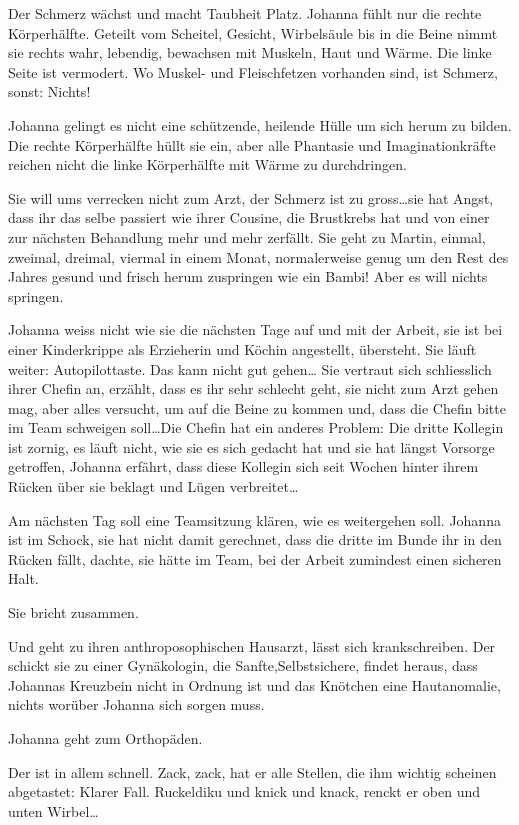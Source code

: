 \documentclass[10pt,titlepage,a5paper]{book}
\begin{document}
Der Schmerz wächst  und macht Taubheit Platz. Johanna fühlt nur die rechte Körperhälfte. Geteilt vom Scheitel, Gesicht, Wirbelsäule bis in die Beine nimmt sie rechts wahr, lebendig, bewachsen mit Muskeln, Haut und Wärme. Die linke Seite ist vermodert. Wo Muskel- und Fleischfetzen vorhanden sind, ist Schmerz, sonst: Nichts! 

Johanna gelingt es nicht eine schützende, heilende Hülle um sich herum zu bilden. Die rechte Körperhälfte hüllt sie ein, aber alle Phantasie und Imaginationkräfte reichen nicht die linke Körperhälfte mit Wärme zu durchdringen.

Sie will ums verrecken nicht zum Arzt, der Schmerz ist zu gross\dots sie hat Angst, dass ihr das selbe passiert wie ihrer Cousine, die Brustkrebs hat und von einer zur nächsten Behandlung mehr und mehr zerfällt.
Sie geht zu Martin, einmal, zweimal, dreimal, viermal in einem Monat, normalerweise genug um den Rest des Jahres gesund und frisch herum zuspringen wie ein Bambi! Aber es will nichts springen.

Johanna weiss nicht wie sie die nächsten Tage auf und mit der Arbeit, sie ist bei einer Kinderkrippe als Erzieherin und Köchin angestellt, übersteht. Sie läuft weiter: Autopilottaste. Das kann nicht gut gehen\dots 
Sie vertraut sich schliesslich ihrer Chefin an, erzählt, dass es ihr sehr schlecht geht, sie nicht zum Arzt gehen mag, aber alles versucht, um auf die Beine zu kommen und, dass die Chefin bitte im Team schweigen soll\dots  Die Chefin hat ein anderes Problem: Die dritte Kollegin ist zornig, es läuft nicht, wie sie es sich gedacht hat und sie hat längst Vorsorge getroffen, Johanna erfährt, dass diese Kollegin sich seit Wochen hinter ihrem Rücken über sie beklagt und Lügen verbreitet\dots 

Am nächsten Tag soll eine Teamsitzung klären, wie es weitergehen soll.
Johanna ist im Schock, sie hat nicht damit gerechnet, dass die dritte im Bunde ihr in den Rücken fällt, dachte, sie hätte im Team, bei der Arbeit zumindest einen sicheren Halt.

Sie bricht zusammen. 

Und geht zu ihren anthroposophischen Hausarzt, lässt sich krankschreiben. Der schickt sie zu einer Gynäkologin, die Sanfte,Selbstsichere, findet heraus, dass Johannas Kreuzbein nicht in Ordnung ist und das Knötchen eine Hautanomalie, nichts worüber Johanna sich sorgen muss.

Johanna geht zum Orthopäden.

Der ist in allem schnell. Zack, zack, hat er alle Stellen, die ihm wichtig scheinen abgetastet: Klarer Fall. Ruckeldiku und knick und knack, renckt er oben und unten Wirbel\dots
\end{document}

